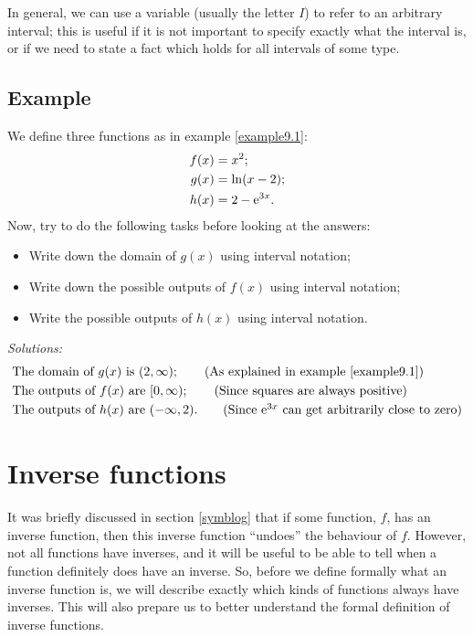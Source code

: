 \noindent In general, we can use a variable (usually the letter $I$) to refer to an arbitrary interval; this is useful if it is not important to specify exactly what the interval is, or if we need to state a fact which holds for all intervals of some type.

\subsection{Example}
We define three functions as in example \ref{example9.1}: 
\begin{align*}
f(x) & = x^2; \\
g(x) & = \ln(x - 2); \\
h(x) & = 2 - \mathrm{e}^{3x}.
\end{align*}
Now, try to do the following tasks before looking at the answers:
\begin{itemize}
\item Write down the domain of $g(x)$ using interval notation;
\item Write down the possible outputs of $f(x)$ using interval notation;
\item Write the possible outputs of $h(x)$ using interval notation.
\end{itemize}
\bigskip
\textit{Solutions:}
\begin{align*}
&\text{The domain of $g(x)$ is $(2,\infty)$}; \tag{As explained in example \ref{example9.1}}\\
&\text{The outputs of $f(x)$ are $[0,\infty)$}; \tag{Since squares are always positive} \\
&\text{The outputs of $h(x)$ are $(-\infty,2)$}. \tag{Since $\e^{3x}$ can get arbitrarily close to zero}
\end{align*}

\section{Inverse functions} \label{inverse functions 3}
It was briefly discussed in section \ref{symblog} that if some function, $f$, has an inverse function, then this inverse function ``undoes'' the behaviour of $f$. However, not all functions have inverses, and it will be useful to be able to tell when a function definitely does have an inverse. So, before we define formally what an inverse function is, we will describe exactly which kinds of functions always have inverses. This will also prepare us to better understand the formal definition of inverse functions.

